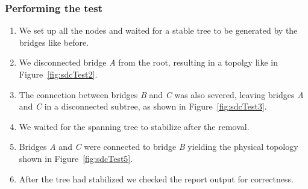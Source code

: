 \subsubsection*{Performing the test}
\begin{enumerate}
    \item We set up all the nodes and waited for a stable tree to be generated by the bridges like before.
    \item We disconnected bridge \textit{A} from the root, resulting in a topolgy like in Figure~\ref{fig:sdcTest2}.
    \item The connection between bridges \textit{B} and \textit{C} was also severed, leaving bridges \textit{A} and \textit{C} in a disconnected subtree, as shown in Figure~\ref{fig:sdcTest3}.
    \item We waited for the spanning tree to stabilize after the removal.
    \item Bridges \textit{A} and \textit{C} were connected to bridge \textit{B} yielding the physical topology shown in Figure~\ref{fig:sdcTest5}.
    \item After the tree had stabilized we checked the report output for correctness.
\end{enumerate}

